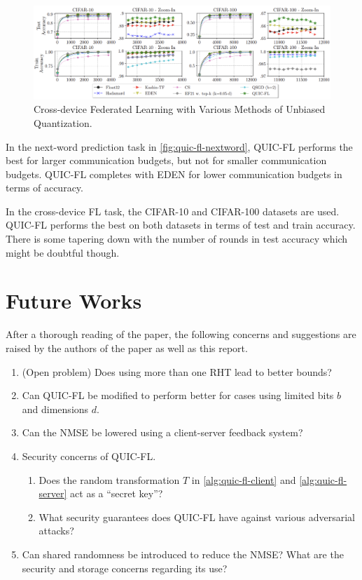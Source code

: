 \documentclass[journal,12pt,twocolumn]{IEEEtran}
\begin{document}
\begin{figure}[!ht]
    \centering
    \includegraphics[width=\columnwidth]{images/results.png}
    \caption{Cross-device Federated Learning with Various Methods of Unbiased
    Quantization. \cite{basat2023quicfl}}
    \label{fig:quic-fl-acc}
\end{figure}

In the next-word prediction task in \autoref{fig:quic-fl-nextword}, QUIC-FL
performs the best for larger communication budgets, but not for smaller
communication budgets. QUIC-FL completes with EDEN for lower communication
budgets in terms of accuracy.

In the cross-device FL task, the CIFAR-10 and CIFAR-100 datasets are used.
QUIC-FL performs the best on both datasets in terms of test and train accuracy.
There is some tapering down with the number of rounds in test accuracy which
might be doubtful though.

\section{Future Works}
\label{sec:future}

After a thorough reading of the paper, the following concerns and suggestions
are raised by the authors of the paper as well as this report.
\begin{enumerate}
    \item (Open problem) Does using more than one RHT lead to better bounds?
    \item Can QUIC-FL be modified to perform better for cases using limited bits
    \(b\) and dimensions \(d\).
    \item Can the NMSE be lowered using a client-server feedback system?
    \item Security concerns of QUIC-FL.
    \begin{enumerate}
        \item Does the random transformation \(T\) in
        \autoref{alg:quic-fl-client} and \autoref{alg:quic-fl-server} act as a
        ``secret key''?
        \item What security guarantees does QUIC-FL have against various
        adversarial attacks?
    \end{enumerate}
    \item Can shared randomness be introduced to reduce the NMSE? What are the
    security and storage concerns regarding its use?
\end{enumerate}


\end{document}

